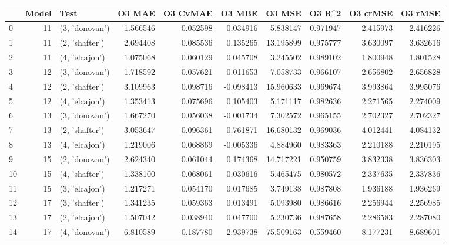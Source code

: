 \begin{tabular}{lrlrrrrrrr}
\toprule
{} &  Model &            Test &    O3 MAE &  O3 CvMAE &    O3 MBE &     O3 MSE &    O3 R\textasciicircum2 &  O3 crMSE &   O3 rMSE \\
\midrule
0  &     11 &  (3, 'donovan') &  1.566546 &  0.052598 &  0.034916 &   5.838147 &  0.971947 &  2.415973 &  2.416226 \\
1  &     11 &  (2, 'shafter') &  2.694408 &  0.085536 &  0.135265 &  13.195899 &  0.975777 &  3.630097 &  3.632616 \\
2  &     11 &  (4, 'elcajon') &  1.075068 &  0.060129 &  0.045708 &   3.245502 &  0.989102 &  1.800948 &  1.801528 \\
3  &     12 &  (3, 'donovan') &  1.718592 &  0.057621 &  0.011653 &   7.058733 &  0.966107 &  2.656802 &  2.656828 \\
4  &     12 &  (2, 'shafter') &  3.109963 &  0.098716 & -0.098413 &  15.960633 &  0.969674 &  3.993864 &  3.995076 \\
5  &     12 &  (4, 'elcajon') &  1.353413 &  0.075696 &  0.105403 &   5.171117 &  0.982636 &  2.271565 &  2.274009 \\
6  &     13 &  (3, 'donovan') &  1.667270 &  0.056038 & -0.001734 &   7.302572 &  0.965155 &  2.702327 &  2.702327 \\
7  &     13 &  (2, 'shafter') &  3.053647 &  0.096361 &  0.761871 &  16.680132 &  0.969036 &  4.012441 &  4.084132 \\
8  &     13 &  (4, 'elcajon') &  1.219006 &  0.068869 & -0.005336 &   4.884960 &  0.983363 &  2.210188 &  2.210195 \\
9  &     15 &  (2, 'donovan') &  2.624340 &  0.061044 &  0.174368 &  14.717221 &  0.950759 &  3.832338 &  3.836303 \\
10 &     15 &  (4, 'shafter') &  1.338100 &  0.068061 &  0.030616 &   5.465475 &  0.980572 &  2.337635 &  2.337836 \\
11 &     15 &  (3, 'elcajon') &  1.217271 &  0.054170 &  0.017685 &   3.749138 &  0.987808 &  1.936188 &  1.936269 \\
12 &     17 &  (3, 'shafter') &  1.341235 &  0.059363 &  0.013491 &   5.093980 &  0.986616 &  2.256944 &  2.256985 \\
13 &     17 &  (2, 'elcajon') &  1.507042 &  0.038940 &  0.047700 &   5.230736 &  0.987658 &  2.286583 &  2.287080 \\
14 &     17 &  (4, 'donovan') &  6.810589 &  0.187780 &  2.939738 &  75.509163 &  0.559460 &  8.177231 &  8.689601 \\

\end{tabular}
